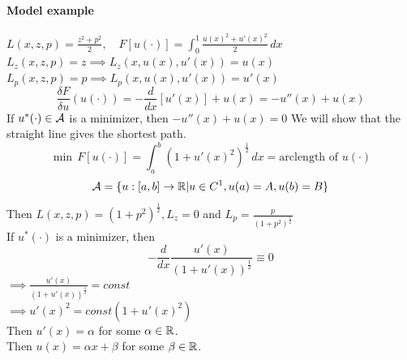 \documentclass[11pt]{article}
\begin{document}
\paragraph{Model example}
$L(x, z, p) = \frac{z^2 + p^2}{2}, \quad F[u(\cdot)] = \int_0^1 \frac{u(x)^2 + u'(x)^2}{2} \, dx$\\
$L_z(x,z,p) = z \implies L_z(x,u(x),u'(x)) = u(x)$ \\
$L_p(x,z,p) = p \implies L_p(x,u(x),u'(x)) = u'(x)$ \\
$$\frac{\delta F}{\delta u}(u(\cdot)) = -\frac{d}{dx}[u'(x)] + u(x) = -u''(x) + u(x)$$
If $u^*(\cdot) \in \mathcal{A}$ is a minimizer, then
$-u''(x) + u(x) = 0$
We will show that the straight line gives the shortest path.\\
$$\min \, F[u(\cdot)] = \int_a^b(1+u'(x)^2)^\frac{1}{2}\,dx = \text{arclength of $u(\cdot)$}$$
$$\mathcal{A} = \{ u: [a,b] \rightarrow \mathbb{R} | u \in C^1, u(a) = A, u(b) = B\}$$
Then $L(x,z,p) = (1+p^2)^{\frac{1}{2}}, L_z = 0$ and $L_p = \frac{p}{(1+p^2)^\frac{1}{2}}$ \\
If $u^*(\cdot)$ is a minimizer, then
$$- \frac{d}{dx}\frac{u'(x)}{(1+u'(x))^\frac{1}{2}} \equiv 0$$
$\implies \frac{u'(x)}{(1+u'(x))^\frac{1}{2}} = const$ \\
$\implies u'(x)^2 = const(1 + u'(x)^2)$ \\
Then $u'(x) = \alpha$ for some $\alpha \in \mathbb{R}$. \\
Then $u(x) = \alpha x + \beta $ for some $\beta \in \mathbb{R}$.
\end{document}
